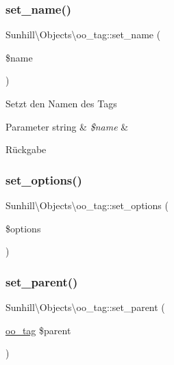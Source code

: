 \subsubsection{\texorpdfstring{set\+\_\+name()}{set\_name()}}
{\footnotesize\ttfamily Sunhill\textbackslash{}\+Objects\textbackslash{}oo\+\_\+tag\+::set\+\_\+name (\begin{DoxyParamCaption}\item[{}]{\$name }\end{DoxyParamCaption})}

Setzt den Namen des Tags 
\begin{DoxyParams}[1]{Parameter}
string & {\em \$name} & \\
\hline
\end{DoxyParams}
\begin{DoxyReturn}{Rückgabe}

\end{DoxyReturn}
\mbox{\label{classSunhill_1_1Objects_1_1oo__tag_a212672b37f3569f39cbc7e3d37c98717}} 
\subsubsection{\texorpdfstring{set\+\_\+options()}{set\_options()}}
{\footnotesize\ttfamily Sunhill\textbackslash{}\+Objects\textbackslash{}oo\+\_\+tag\+::set\+\_\+options (\begin{DoxyParamCaption}\item[{}]{\$options }\end{DoxyParamCaption})}

\mbox{\label{classSunhill_1_1Objects_1_1oo__tag_a18e07d36208660c7f4686ff850a6213c}} 
\subsubsection{\texorpdfstring{set\+\_\+parent()}{set\_parent()}}
{\footnotesize\ttfamily Sunhill\textbackslash{}\+Objects\textbackslash{}oo\+\_\+tag\+::set\+\_\+parent (\begin{DoxyParamCaption}\item[{\hyperlink{classSunhill_1_1Objects_1_1oo__tag}{oo\+\_\+tag}}]{\$parent }\end{DoxyParamCaption})}

